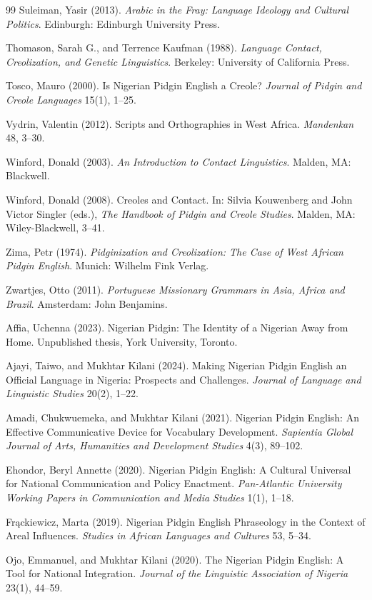 \documentclass[12pt]{article}
\begin{document}
\begin{thebibliography}{99}
Suleiman, Yasir (2013).
\textit{Arabic in the Fray: Language Ideology and Cultural Politics}.
Edinburgh: Edinburgh University Press.

Thomason, Sarah G., and Terrence Kaufman (1988).
\textit{Language Contact, Creolization, and Genetic Linguistics}.
Berkeley: University of California Press.

Tosco, Mauro (2000).
Is Nigerian Pidgin English a Creole?
\textit{Journal of Pidgin and Creole Languages} 15(1), 1--25.

Vydrin, Valentin (2012).
Scripts and Orthographies in West Africa.
\textit{Mandenkan} 48, 3--30.

Winford, Donald (2003).
\textit{An Introduction to Contact Linguistics}.
Malden, MA: Blackwell.

Winford, Donald (2008).
Creoles and Contact.
In: Silvia Kouwenberg and John Victor Singler (eds.),
\textit{The Handbook of Pidgin and Creole Studies}.
Malden, MA: Wiley-Blackwell, 3--41.

Zima, Petr (1974).
\textit{Pidginization and Creolization: The Case of West African Pidgin English}.
Munich: Wilhelm Fink Verlag.

Zwartjes, Otto (2011).
\textit{Portuguese Missionary Grammars in Asia, Africa and Brazil}.
Amsterdam: John Benjamins.

Affia, Uchenna (2023).
Nigerian Pidgin: The Identity of a Nigerian Away from Home.
Unpublished thesis, York University, Toronto.

Ajayi, Taiwo, and Mukhtar Kilani (2024).
Making Nigerian Pidgin English an Official Language in Nigeria: Prospects and Challenges.
\textit{Journal of Language and Linguistic Studies} 20(2), 1--22.

Amadi, Chukwuemeka, and Mukhtar Kilani (2021).
Nigerian Pidgin English: An Effective Communicative Device for Vocabulary Development.
\textit{Sapientia Global Journal of Arts, Humanities and Development Studies} 4(3), 89--102.

Ehondor, Beryl Annette (2020).
Nigerian Pidgin English: A Cultural Universal for National Communication and Policy Enactment.
\textit{Pan-Atlantic University Working Papers in Communication and Media Studies} 1(1), 1--18.

Fr\k{a}ckiewicz, Marta (2019).
Nigerian Pidgin English Phraseology in the Context of Areal Influences.
\textit{Studies in African Languages and Cultures} 53, 5--34.

Ojo, Emmanuel, and Mukhtar Kilani (2020).
The Nigerian Pidgin English: A Tool for National Integration.
\textit{Journal of the Linguistic Association of Nigeria} 23(1), 44--59.

\end{thebibliography}
\end{document}
